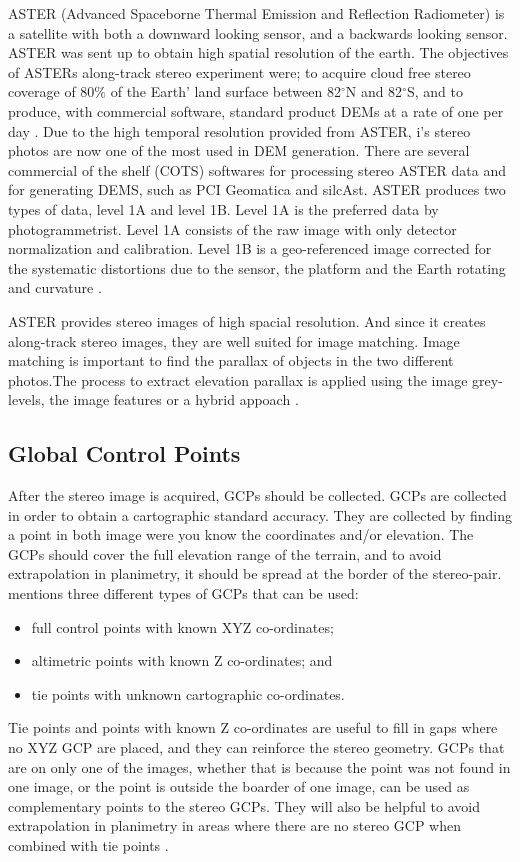 \documentclass[a4paper,UKenglish]{article}
\begin{document}
 ASTER (Advanced Spaceborne Thermal Emission and Reflection Radiometer) is a satellite with both a downward looking sensor, and a backwards looking sensor. ASTER was sent up to obtain high spatial resolution of the earth. The objectives of ASTERs along-track stereo experiment were; to acquire cloud free stereo coverage of 80$\%$ of the Earth' land surface between 82$^{\circ}$N and 82$^{\circ}$S, and to produce, with commercial software, standard product DEMs at a rate of one per day \citep{toutin08}. Due to the high temporal resolution provided from ASTER, i's stereo photos are now one of the most used in DEM generation. There are several commercial of the shelf (COTS) softwares for processing stereo ASTER data and for generating DEMS, such as PCI Geomatica and silcAst. ASTER produces two types of data, level 1A and level 1B. Level 1A is the preferred data by photogrammetrist. Level 1A consists of the raw image with only detector normalization and calibration. Level 1B is a geo-referenced image corrected for the systematic distortions due to the sensor, the platform and the Earth rotating and curvature \citep{toutin01}. 

 ASTER provides stereo images of high spacial resolution. And since it creates along-track stereo images, they are well suited for image matching. Image matching is important to find the parallax of objects in the two different photos.The process to extract elevation parallax is applied using the image grey-levels, the image features or a hybrid appoach \citep{toutin08}. 

\subsection{Global Control Points}
After the stereo image is acquired, GCPs should be collected. GCPs are collected in order to obtain a cartographic standard accuracy. They are collected by finding a point in both image were you know the coordinates and/or elevation. The GCPs should cover the full elevation range of the terrain, and to avoid extrapolation in planimetry, it should be spread at the border of the stereo-pair. \cite{toutin01} mentions three different types of GCPs that can be used:
\begin{itemize}
	\item full control points with known XYZ co-ordinates;
	\item altimetric points with known Z co-ordinates; and
	\item tie points with unknown cartographic co-ordinates.
\end{itemize}
Tie points and points with known Z co-ordinates are useful to fill in gaps where no XYZ GCP are placed, and they can reinforce the stereo geometry. GCPs that are on only one of the images, whether that is because the point was not found in one image, or the point is outside the boarder of one image, can be used as complementary points to the stereo GCPs. They will also be helpful to avoid extrapolation in planimetry in areas where there are no stereo GCP when combined with tie points \citep{toutin01}.
\end{document}
